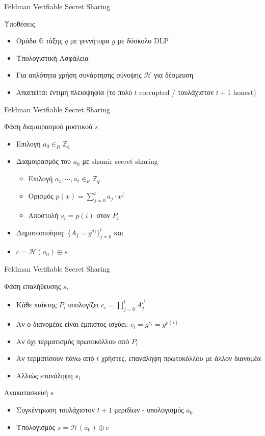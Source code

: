 \documentclass[handout]{beamer}
\begin{document}
\begin{frame}{Feldman Verifiable Secret Sharing}
\begin{block}{Υποθέσεις}
	\begin{itemize}
		\item Ομάδα $\mathbb{G}$ τάξης $q$ με γεννήτορα $g$ με δύσκολο DLP
		\item Υπολογιστική Ασφάλεια
		\item Για απλότητα χρήση συνάρτησης σύνοψης $\mathcal{H}$ για δέσμευση
		\item Απαιτείται έντιμη πλειοψηφία (το πολύ $t$ corrupted / τουλάχιστον $t+1$ honest)
 	\end{itemize}
\end{block}
\end{frame}

\begin{frame}{Feldman Verifiable Secret Sharing}
\begin{block}{Φάση διαμοιρασμού μυστικού $s$}
	\begin{itemize}
		\item Επιλογή $a_0 \in_R \mathbb{Z}_q$
		\item Διαμοιρασμός του $a_0$ με shamir secret sharing
		\begin{itemize}
				\item Επιλογή $a_1, \cdots, a_t \in_R \mathbb{Z}_q$
				\item Ορισμός $p(x) = \sum_{j=0}^{t}a_j \cdot x^j$
				\item Αποστολή $s_i = p(i)$ στον $P_i$
		\end{itemize}
		\item Δημοσιοποίηση: $\{ A_j = g^{a_j} \}_{j=0}^t$ και
		\item $c = \mathcal{H}(a_0) \oplus s$
		\end{itemize}
\end{block}
\end{frame}

\begin{frame}{Feldman Verifiable Secret Sharing}
	\begin{block}{Φάση επαλήθευσης $s_i$}
		\begin{itemize}
			\item Κάθε παίκτης $P_i$ υπολογίζει $c_i = \prod_{j=0}^{t}A_j^{i^j}$
			\item Αν ο διανομέας είναι έμπιστος ισχύει:
			$c_i = g^{s_i} = g^{p(i)}$
			\item Αν όχι τερματισμός πρωτοκόλλου από $P_i$
			\item Αν τερματίσουν πάνω από $t$ χρήστες, επανάληψη πρωτοκόλλου με άλλον διανομέα 
			\item Αλλιώς επανάληψη $s_i$	
		\end{itemize}		
	\end{block}
	\begin{block}{Ανακατασκευή $s$}
		\begin{itemize}
			\item Συγκέντρωση τουλάχιστον $t+1$ μεριδίων - υπολογισμός $a_0$
			\item Υπολογισμός $s = \mathcal{H}(a_0) \oplus c$
		\end{itemize}
	\end{block}
\end{frame}
\end{document}
